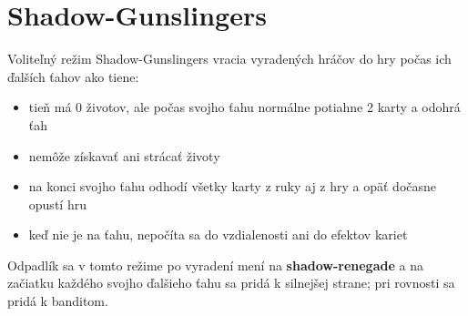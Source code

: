 \section*{Shadow-Gunslingers}
Voliteľný režim Shadow-Gunslingers vracia vyradených hráčov do hry počas ich ďalších ťahov ako tiene:
\begin{itemize}
    \item tieň má 0 životov, ale počas svojho ťahu normálne potiahne 2 karty a odohrá ťah
    \item nemôže získavať ani strácať životy
    \item na konci svojho ťahu odhodí všetky karty z ruky aj z hry a opäť dočasne opustí hru
    \item keď nie je na ťahu, nepočíta sa do vzdialenosti ani do efektov kariet
\end{itemize}

Odpadlík sa v tomto režime po vyradení mení na \textbf{shadow-renegade} a na začiatku každého svojho ďalšieho ťahu sa pridá k silnejšej strane; pri rovnosti sa pridá k banditom.
